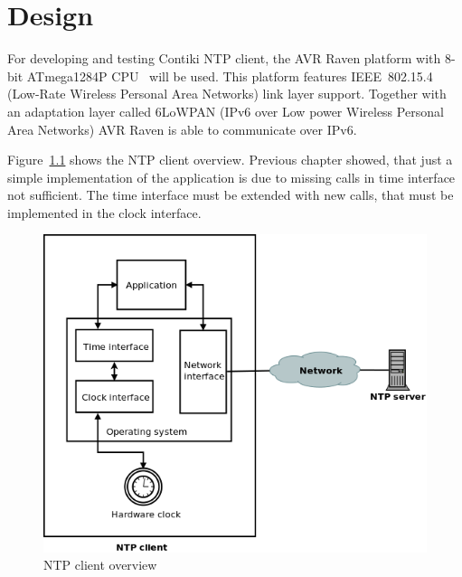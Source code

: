 
\chapter{Design}
For developing and testing Contiki NTP client,
the AVR Raven platform with 8-bit ATmega1284P CPU~\cite{avr-datasheet} will be used.
This platform features IEEE~802.15.4 (Low-Rate Wireless Personal Area Networks) link layer support.
Together with an adaptation layer called 6LoWPAN (IPv6 over Low power Wireless Personal Area Networks)
AVR Raven is able to communicate over IPv6.

Figure~\ref{fig:design-overview} shows the NTP client overview.
Previous chapter showed, that just a simple implementation of the application
is due to missing calls in time interface not sufficient.
The time interface must be extended with new calls,
that must be implemented in the clock interface.

\begin{figure}[H]
  \centering
  \includegraphics[width=13cm,keepaspectratio]{fig/design.png}
  \caption{NTP client overview} %
  \label{fig:design-overview} %
\end{figure}









%
